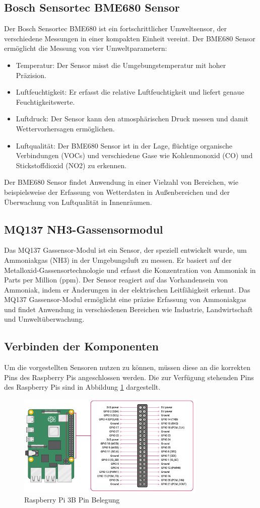 \documentclass[conference]{IEEEtran}
\begin{document}
\subsection{Bosch Sensortec BME680 Sensor}
Der Bosch Sensortec BME680 ist ein fortschrittlicher Umweltsensor, der verschiedene Messungen in einer kompakten Einheit vereint. Der BME680 Sensor ermöglicht die Messung von vier Umweltparametern:
\begin{itemize}
	\item Temperatur: Der Sensor misst die Umgebungstemperatur mit hoher Präzision.
	\item Luftfeuchtigkeit: Er erfasst die relative Luftfeuchtigkeit und liefert genaue Feuchtigkeitswerte.
	\item Luftdruck: Der Sensor kann den atmosphärischen Druck messen und damit Wettervorhersagen ermöglichen.
	\item Luftqualität: Der BME680 Sensor ist in der Lage, flüchtige organische Verbindungen (VOCs) und verschiedene Gase wie Kohlenmonoxid (CO) und Stickstoffdioxid (NO2) zu erkennen.
\end{itemize}
Der BME680 Sensor findet Anwendung in einer Vielzahl von Bereichen, wie beispielsweise der Erfassung von Wetterdaten in Außenbereichen und der Überwachung von Luftqualität in Innenräumen. \cite{bme}
\subsection{MQ137 NH3-Gassensormodul}
Das MQ137 Gassensor-Modul ist ein Sensor, der speziell entwickelt wurde, um Ammoniakgas (NH3) in der Umgebungsluft zu messen. Er basiert auf der Metalloxid-Gassensortechnologie und erfasst die Konzentration von Ammoniak in Parts per Million (ppm). Der Sensor reagiert auf das Vorhandensein von Ammoniak, indem er Änderungen in der elektrischen Leitfähigkeit erkennt. Das MQ137 Gassensor-Modul ermöglicht eine präzise Erfassung von Ammoniakgas und findet Anwendung in verschiedenen Bereichen wie Industrie, Landwirtschaft und Umweltüberwachung.

\subsection{Verbinden der Komponenten}
Um die vorgestellten Sensoren nutzen zu können, müssen diese an die korrekten Pins des Raspberry Pis angeschlossen werden. Die zur Verfügung stehenden Pins des Raspberry Pis sind in Abbildung \ref{pi_pins} dargestellt.

\begin{figure}[H]
	\centering
	\includegraphics[width=90mm]{fig/pi_pins.png}
	\caption{Raspberry Pi 3B Pin Belegung}
	\label{pi_pins}
\end{figure}
\end{document}
